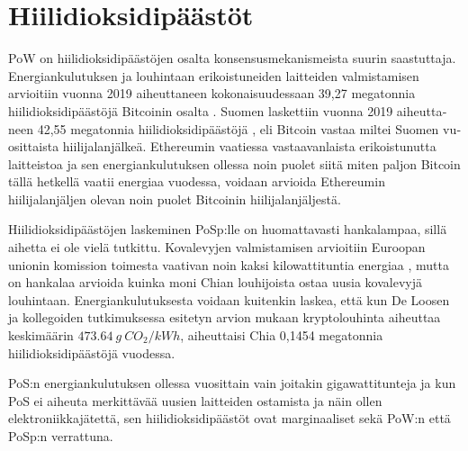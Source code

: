 \section{Hiilidioksidipäästöt\label{hiilidioksidipaastot}}
\begin{otherlanguage}{english}

PoW on hiilidioksidipäästöjen osalta konsensusmekanismeista suurin saastuttaja. Energiankulutuksen ja louhintaan erikoistuneiden laitteiden valmistamisen arvioitiin vuonna 2019 aiheuttaneen kokonaisuudessaan 39,27 megatonnia hiilidioksidipäästöjä Bitcoinin osalta \cite{btc-carbon-ewaste}. Suomen laskettiin vuonna 2019 aiheuttaneen 42,55 megatonnia hiilidioksidipäästöjä \cite{carbon-finland}, eli Bitcoin vastaa miltei Suomen vuosittaista hiilijalanjälkeä. Ethereumin vaatiessa vastaavanlaista erikoistunutta laitteistoa ja sen energiankulutuksen ollessa noin puolet siitä miten paljon Bitcoin tällä hetkellä vaatii energiaa vuodessa, voidaan arvioida Ethereumin hiilijalanjäljen olevan noin puolet Bitcoinin hiilijalanjäljestä.

Hiilidioksidipäästöjen laskeminen PoSp:lle on huomattavasti hankalampaa, sillä aihetta ei ole vielä tutkittu. Kovalevyjen valmistamisen arvioitiin Euroopan unionin komission toimesta vaativan noin kaksi kilowattituntia energiaa \cite{manufacturingcarbon1}, mutta on hankalaa arvioida kuinka moni Chian louhijoista ostaa uusia kovalevyjä louhintaan. Energiankulutuksesta voidaan kuitenkin laskea, että kun De Loosen ja kollegoiden tutkimuksessa \cite{btc-carbon-ewaste} esitetyn arvion mukaan kryptolouhinta aiheuttaa keskimäärin \(473.64~g~CO_{2}/kWh \), aiheuttaisi Chia 0,1454 megatonnia hiilidioksidipäästöjä vuodessa.

PoS:n energiankulutuksen ollessa vuosittain vain joitakin gigawattitunteja ja kun PoS ei aiheuta merkittävää uusien laitteiden ostamista ja näin ollen elektroniikkajätettä, sen hiilidioksidipäästöt ovat marginaaliset sekä PoW:n että PoSp:n verrattuna.

\end{otherlanguage}